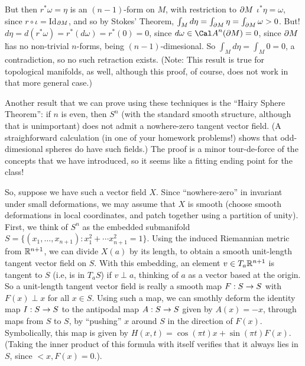 But then $r^*\omega=\eta$ is an $(n-1)$-form on $M$, with restriction to $\partial M$ $\iota^*\eta=\omega$,
since $r\circ \iota =$Id$_{\partial M}$, and so by Stokes' Theorem, 
$\int_M d\eta=\int_{\partial M}\eta=\int_{\partial M}\omega>0$. But! $d\eta=d(r^*\omega)=r^*(d\omega)=r^*(0)=0$,
since $d\omega\in {\Cal A}^n(\del M)=0$, since $\partial M$ \u{has} no non-trivial $n$-forms, being
$(n-1)$-dimesional. So $\int_M d\eta=\int_M 0=0$, a contradiction, so no such retraction exists.
(Note: This result is true for topological manifolds, as well, although this proof, of course, does
not work in that more general case.)

\ssk

Another result that we can prove using these techniques is the ``Hairy Sphere Theorem'': if $n$ is even,
then $S^n$ (with the standard smooth structure, although that is unimportant) does not admit a 
nowhere-zero tangent vector field. (A straighforward calculation (in one of your homework problems!)
shows that odd-dimesional spheres do have such fields.) The proof is a minor tour-de-force of the
concepts that we have introduced, so it seems like a fitting ending point for the class!

So, suppose we have such a vector field $X$. Since ``nowhere-zero'' in invariant under small
deformations, we may assume that $X$ is smooth (choose smooth deformations in local coordinates, and
patch together using a partition of unity).
First, we think of $S^n$ as the embedded submanifold $S=\{(x_1,\ldots,x_{n+1}) : x_1^2+\cdots x_{n+1}^2=1\}$.
Using the induced Riemannian metric from ${\Bbb R}^{n+1}$, we can divide $X(a)$ by its length, to obtain 
a smooth unit-length tangent vector field on $S$.
With this embedding, an element $v\in T_a{\Bbb R}^{n+1}$ is tangent to $S$ (i.e, is in $T_aS$) if
$v\perp a$, thinking of $a$ as a vector based at the origin. So a unit-length tangent vector field is 
really a smooth map $F:S\rightarrow S$ with $F(x)\perp x$ for all $x\in S$. Using such a map,
we can smothly deform the identity map $I:S\rightarrow S$ to the antipodal map $A:S\rightarrow S$
given by $A(x)=-x$, through maps from $S$ to $S$, by ``pushing'' $x$ around $S$ in the direction
of $F(x)$. Symbolically, this map is given by
$H(x,t)=\cos(\pi t)x+\sin(\pi t)F(x)$. (Taking the inner product of this formula with itself verifies
that it always lies in $S$, since $<x,F(x)=0$.).

